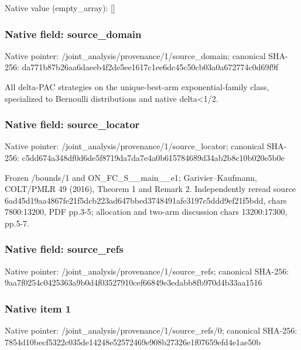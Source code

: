 \documentclass[10pt,a4paper]{article}
\begin{document}
Native value (empty\_\allowbreak{}array): []

\subsubsection{Native field: source\_\allowbreak{}domain}
Native pointer: /joint\_\allowbreak{}analysis/provenance/1/source\_\allowbreak{}domain; canonical SHA-256: da771b87b26aa6daeeb4f2de5ee1617c1ee6dc45c50cb03a0a672774c0d69f9f

\begingroup\raggedright\sloppy All delta-PAC strategies on the unique-best-arm exponential-family class,\allowbreak{} specialized to Bernoulli distributions and native delta<1/\allowbreak{}2.\par\endgroup

\subsubsection{Native field: source\_\allowbreak{}locator}
Native pointer: /joint\_\allowbreak{}analysis/provenance/1/source\_\allowbreak{}locator; canonical SHA-256: c5dd674a348df0d6de5f8719da7da7e4a0b615784689d34ab2b8c10b020e5b0e

\begingroup\raggedright\sloppy Frozen /\allowbreak{}bounds/\allowbreak{}1 and ON\_\allowbreak{}FC\_\allowbreak{}S\_\allowbreak{}\_\allowbreak{}main\_\allowbreak{}\_\allowbreak{}e1;\allowbreak{} Garivier--Kaufmann,\allowbreak{} COLT/\allowbreak{}PMLR 49 (2016),\allowbreak{} Theorem 1 and Remark 2. Independently reread source 6ad45d19aa4867fe21f5dcb223ad647bbed3748491afe3197c5ddd9ef21f5bdd,\allowbreak{} chars 7800:\allowbreak{}13200,\allowbreak{} PDF pp.3-5;\allowbreak{} allocation and two-arm discussion chars 13200:\allowbreak{}17300,\allowbreak{} pp.5-7.\par\endgroup

\subsubsection{Native field: source\_\allowbreak{}refs}
Native pointer: /joint\_\allowbreak{}analysis/provenance/1/source\_\allowbreak{}refs; canonical SHA-256: 9aa7f0254c0425363a9b0d4f03527910cef66849e3edabb8fb970d4b33aa1516

\subsubsection{Native item 1}
Native pointer: /joint\_\allowbreak{}analysis/provenance/1/source\_\allowbreak{}refs/0; canonical SHA-256: 7854d10becf5322c035de14248e52572469e908b27326e1f07659efd4e1ae50b
\end{document}
